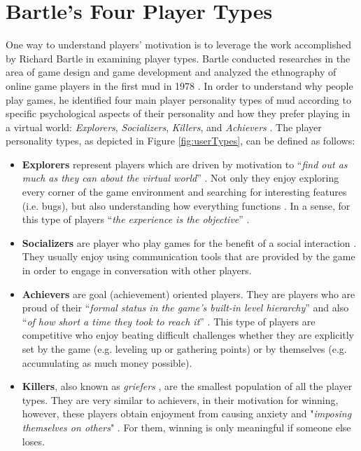 \section{Bartle's Four Player Types}
One way to understand players' motivation is to leverage the work accomplished by Richard Bartle in examining player types. Bartle conducted researches in the area of game design and game development and analyzed the ethnography of online game players in the first \acrfull{mud} in 1978 \cite{mud}. In order to understand why people play games, he identified four main player personality types of \acrshort{mud} according to specific psychological aspects of their personality and how they prefer playing in a virtual world: \textit{Explorers}, \textit{Socializers}, \textit{Killers}, and \textit{Achievers} \cite{bartle1996hearts}. The player personality types, as depicted in Figure \ref{fig:userTypes}, can be defined as follows:
\begin{itemize}
\item \textbf{Explorers} represent players which are driven by motivation to ``\textit{find out as much as they can about the 
virtual  world}'' \cite{bartle1996hearts}. Not only they enjoy exploring every corner of the game environment and searching for interesting features (i.e. bugs), but also understanding  how 
everything functions \cite{bartle1996hearts}. 
In a sense, for this type of players ``\textit{the experience is the objective}'' \cite{zichermann2011gamification}.
\item \textbf{Socializers} are player who play games for the benefit of a social interaction \cite{zichermann2011gamification}. They usually enjoy using communication tools that are provided by the game in order to engage in conversation with other players. 
\item \textbf{Achievers} are goal (achievement) oriented players. They are players who are proud of their ``\textit{formal status in the game's built-in level hierarchy}'' and also ``\textit{of how short a time they took to reach it}'' \cite{bartle1996hearts}. This type of players are competitive who enjoy beating difficult challenges whether they are explicitly  set by the game (e.g.  leveling  up  or  gathering  points) or by themselves (e.g. accumulating as much money possible). 
\item \textbf{Killers}, also known as \textit{griefers} \cite{zichermann2011gamification}, are the smallest population of all the player types. They are very similar to achievers, in their motivation for winning, however, these players obtain  enjoyment from causing anxiety and "\textit{imposing  themselves  on  others}" \cite{bartle1996hearts}. For them, winning is only meaningful if someone else loses.
\end{itemize}
